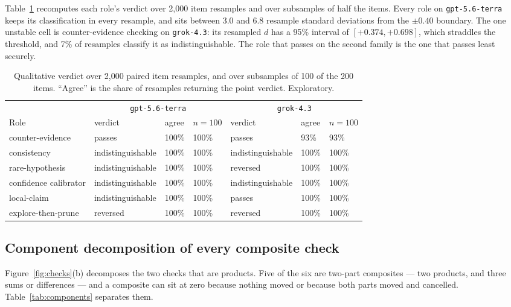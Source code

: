 Table~\ref{tab:verdict-stability} recomputes each role's verdict over 2,000 item resamples and over
subsamples of half the items. Every role on \texttt{gpt-5.6-terra} keeps its classification in every
resample, and sits between 3.0 and 6.8 resample standard deviations from the $\pm 0.40$ boundary. The
one unstable cell is counter-evidence checking on \texttt{grok-4.3}: its resampled $d$ has a 95\%
interval of $[+0.374, +0.698]$, which straddles the threshold, and 7\% of resamples classify it as
indistinguishable. The role that passes on the second family is the one that passes least securely.

\begin{table}[h]
\centering
\small
\begin{tabular}{lllllll}
\toprule
 & \multicolumn{3}{c}{\texttt{gpt-5.6-terra}} & \multicolumn{3}{c}{\texttt{grok-4.3}} \\
\cmidrule(lr){2-4}\cmidrule(lr){5-7}
Role & verdict & agree & $n{=}100$ & verdict & agree & $n{=}100$ \\
\midrule
counter-evidence      & passes            & 100\% & 100\% & passes            & 93\%  & 93\% \\
consistency           & indistinguishable & 100\% & 100\% & indistinguishable & 100\% & 100\% \\
rare-hypothesis       & indistinguishable & 100\% & 100\% & reversed          & 100\% & 100\% \\
confidence calibrator & indistinguishable & 100\% & 100\% & indistinguishable & 100\% & 100\% \\
local-claim           & indistinguishable & 100\% & 100\% & passes            & 100\% & 100\% \\
explore-then-prune    & reversed          & 100\% & 100\% & reversed          & 100\% & 100\% \\
\bottomrule
\end{tabular}
\caption{Qualitative verdict over 2,000 paired item resamples, and over subsamples of 100 of the 200
items. ``Agree'' is the share of resamples returning the point verdict. Exploratory.}
\label{tab:verdict-stability}
\end{table}

\subsection{Component decomposition of every composite check}

Figure~\ref{fig:checks}(b) decomposes the two checks that are products. Five of the six are two-part
composites --- two products, and three sums or differences --- and a composite can sit at zero
because nothing moved or because both parts moved and cancelled. Table~\ref{tab:components}
separates them.

